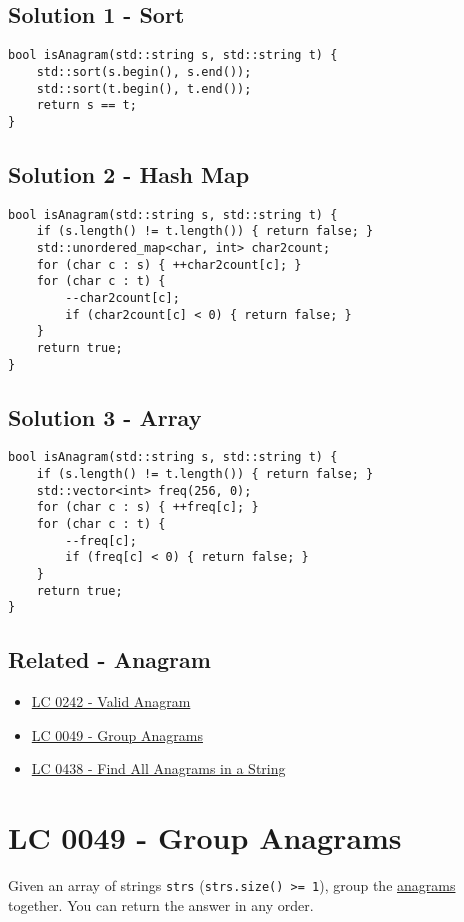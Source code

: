 {\subsection*{Solution 1 - Sort}
\begin{lstlisting}
bool isAnagram(std::string s, std::string t) {
	std::sort(s.begin(), s.end());
	std::sort(t.begin(), t.end());
	return s == t;
}
\end{lstlisting}

\subsection*{Solution 2 - Hash Map}
\begin{lstlisting}
bool isAnagram(std::string s, std::string t) {
	if (s.length() != t.length()) { return false; }
	std::unordered_map<char, int> char2count;
	for (char c : s) { ++char2count[c]; }
	for (char c : t) {
		--char2count[c];
		if (char2count[c] < 0) { return false; }
	}
	return true;
}

\end{lstlisting}

\subsection*{Solution 3 - Array}
\begin{lstlisting}
bool isAnagram(std::string s, std::string t) {
	if (s.length() != t.length()) { return false; }
	std::vector<int> freq(256, 0);
	for (char c : s) { ++freq[c]; }
	for (char c : t) {
		--freq[c];
		if (freq[c] < 0) { return false; }
	}
	return true;
}
\end{lstlisting}

\subsection*{Related - Anagram}
\begin{itemize}
\item \hyperref[lc0242]{LC 0242 - Valid Anagram}
\item \hyperref[lc0049]{LC 0049 - Group Anagrams}
\item \hyperref[lc0438]{LC 0438 - Find All Anagrams in a String}
\end{itemize}

\section{LC 0049 - Group Anagrams}\label{lc0049}
Given an array of strings {\colorbox{CodeBackground}{\lstinline|strs|}} ({\colorbox{CodeBackground}{\lstinline|strs.size() >= 1|}}), group the \ul{anagrams} together. You can return the answer in any order.\\

}
